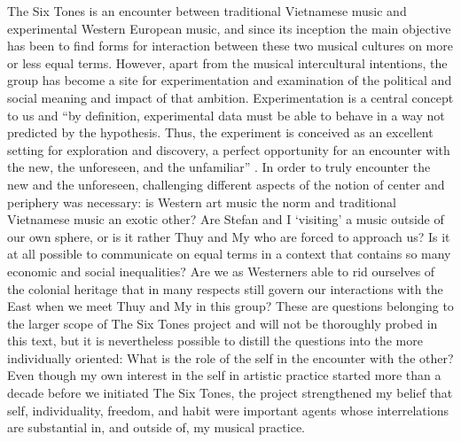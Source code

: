 \documentclass[a4paper]{article}
\begin{document}
The Six Tones is an encounter between traditional Vietnamese music and experimental Western European music, and since its inception the main objective has been to find forms for interaction between these two musical cultures on more or less equal terms. However, apart from the musical intercultural intentions, the group has become a site for experimentation and examination of the political and social meaning and impact of that ambition. Experimentation is a central concept to us and ``by definition, experimental data must be able to behave in a way not predicted by the hypothesis. Thus, the experiment is conceived as an excellent setting for exploration and discovery, a perfect opportunity for an encounter with the new, the unforeseen, and the unfamiliar''  \autocite[165]{corbett2000}. In order to truly encounter the new and the unforeseen, challenging different aspects of the notion of center and periphery was necessary: is Western art music the norm and traditional Vietnamese music an exotic other?  Are Stefan and I ‘visiting’ a music outside of our own sphere, or is it rather Thuy and My who are forced to approach us? Is it at all possible to communicate on equal terms in a context that contains so many economic and social inequalities?  Are we as Westerners able to rid ourselves of the colonial heritage that in many respects still govern our interactions with the East when we meet Thuy and My in this group?  These are questions belonging to the larger scope of The Six Tones project and will not be thoroughly probed in this text, but it is nevertheless possible to distill the questions into the more individually oriented: What is the role of the self in the encounter with the other?  Even though my own interest in the self in artistic practice started more than a decade before we initiated The Six Tones, the project strengthened my belief that self, individuality, freedom, and habit were important agents whose interrelations are substantial in, and outside of, my musical practice.  

\end{document}
